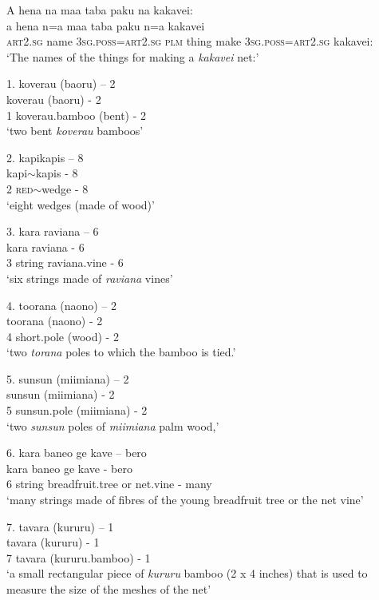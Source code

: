 \newpage
\ea\label{ex:text22-6}
A hena na maa taba paku na kakavei:\\
\gll a	hena	n=a	maa	taba	paku	n=a	kakavei\\
     \textsc{art}2.\textsc{sg}	name	3\textsc{sg}.\textsc{poss}=\textsc{art}2.\textsc{sg}	\textsc{plm}	thing	make	3\textsc{sg}.\textsc{poss}=\textsc{art}2.\textsc{sg}	kakavei:\\
\glt `The names of the things for making a \textit{kakavei} net:'
\z

\ea\label{ex:text22-7}
1. koverau (baoru) -- 2\\
	koverau	(baoru)	-	2\\
     1	koverau.bamboo	(bent)	-	2\\
\glt `two bent \textit{koverau} bamboos'
\z

\ea\label{ex:text22-8}
2. kapikapis -- 8\\
	kapi{$\sim$}kapis	-	8\\
     2	\textsc{red}{$\sim$}wedge	-	8\\
\glt `eight wedges (made of wood)'
\z

\ea\label{ex:text22-9}
3. kara raviana -- 6\\
	kara	raviana	-	6\\
     3	string	raviana.vine	-	6\\
\glt `six strings made of \textit{raviana} vines'
\z

\ea\label{ex:text22-10}
4. toorana (naono) -- 2\\
	toorana	(naono)	-	2\\
     4	short.pole	(wood)	-	2\\
\glt `two \textit{torana} poles to which the bamboo is tied.'
\z

\ea\label{ex:text22-11}
5. sunsun (miimiana) -- 2\\
	sunsun	(miimiana)	-	2\\
     5	sunsun.pole	(miimiana)	-	2\\
\glt `two \textit{sunsun} poles of \textit{miimiana} palm wood,'
\z

\ea\label{ex:text22-12}
6. kara baneo ge kave -- bero\\
	kara	baneo	ge	kave	-	bero\\
     6	string	breadfruit.tree	or	net.vine	-	many\\
\glt `many strings made of fibres of the young breadfruit tree or the net vine'
\z

\ea\label{ex:text22-13}
7. tavara (kururu) -- 1\\
	tavara	(kururu)	-	1\\
     7	tavara	(kururu.bamboo)	-	1\\
\glt `a small rectangular piece of \textit{kururu} bamboo (2 x 4 inches) that is used to measure the size of the meshes of the net'
\z

